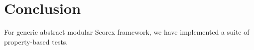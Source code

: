 
\section{Conclusion}
\label{sec:conclusion}

For generic abstract modular Scorex framework, we have implemented a suite of property-based tests.